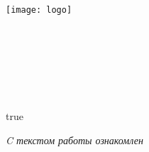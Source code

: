 

\thispagestyle{titlepagestyle}
\begin{SingleSpace}
\begin{center}
\texttt{[image: logo]}\\
{\small
\MakeUppercase{\Univer}\\
\MakeUppercase{\Faculty}\\
\MakeUppercase{\Department}\\[4\baselineskip]
}
\Author\\
\textbf{
  \Title\\[2\baselineskip]
}
\MakeUppercase{\WorkType}\\[3\baselineskip]
\end{center}

\vspace*{2\baselineskip}

\noindent
\ifx\SciAdvisor\empty
%
\else
    \begin{minipage}{0.4\textwidth}
    \phantom{MMMM}
    \end{minipage}
    \begin{minipage}{0.58\textwidth}
            \SingleSpacing
    \end{minipage}

    \def\True{true}
    \ifx\EnableSign\True
    \vspace*{4\baselineskip}
    \begin{minipage}{0.4\textwidth}
    \phantom{MMMM}
    \end{minipage}
    \begin{minipage}{0.58\textwidth}
    {\small\textit{C текстом работы ознакомлен}}\\[2\baselineskip]
    \underline{\phantom{МММММММММММMM}} \SciAdvisorShort
    \end{minipage}
    \fi
\fi

\end{SingleSpace}
